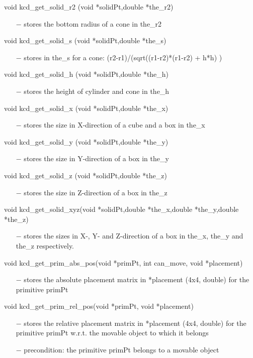 void kcd\_get\_solid\_r2 (void *solidPt,double *the\_r2)
\begin{itemize}
\item[$-$] stores the bottom radius of a cone in the\_r2
\end{itemize}
void kcd\_get\_solid\_s  (void *solidPt,double *the\_s)
\begin{itemize}
\item[$-$] stores in the\_s for a cone: (r2-r1)/(sqrt((r1-r2)*(r1-r2) + h*h) )
\end{itemize}
void kcd\_get\_solid\_h  (void *solidPt,double *the\_h)
\begin{itemize}
\item[$-$] stores the height of cylinder and cone in the\_h
\end{itemize}
void kcd\_get\_solid\_x  (void *solidPt,double *the\_x)
\begin{itemize}
\item[$-$] stores the size in X-direction of a cube and a box in the\_x
\end{itemize}
void kcd\_get\_solid\_y  (void *solidPt,double *the\_y)
\begin{itemize}
\item[$-$] stores the size in Y-direction of a box in the\_y
\end{itemize}
void kcd\_get\_solid\_z  (void *solidPt,double *the\_z)
\begin{itemize}
\item[$-$] stores the size in Z-direction of a box in the\_z
\end{itemize}
void kcd\_get\_solid\_xyz(void *solidPt,double *the\_x,double *the\_y,double *the\_z)
\begin{itemize}
\item[$-$] stores the sizes in X-, Y- and Z-direction of a box in the\_x, the\_y
  and the\_z respectively.
\end{itemize}
void kcd\_get\_prim\_abs\_pos(void *primPt, int can\_move, void *placement)
\begin{itemize}
    \item[$-$] stores the absolute placement matrix in *placement (4x4, double)
      for the primitive primPt
\end{itemize}
void kcd\_get\_prim\_rel\_pos(void *primPt, void *placement)
\begin{itemize}
    \item[$-$] stores the relative placement matrix in *placement (4x4, double)
      for the primitive primPt w.r.t. the movable object to which it belongs
    \item[$-$] precondition: the primitive primPt belongs to a movable object
\end{itemize}
